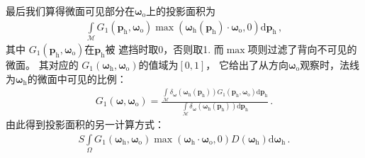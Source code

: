 最后我们算得微面可见部分在${\bm\omega}_{\mathrm{o}}$上的投影面积为
\begin{align}\label{eq:08ex01-AreaProjectionsMicrofacetVisible}
    \int\limits_{\mathcal{M}}G_1({\bm p}_{\mathrm{h}},{\bm\omega}_{\mathrm{o}})
    \max({\bm\omega}_{\mathrm{h}}({\bm p}_{\mathrm{h}})\cdot{\bm\omega}_{\mathrm{o}},0)
    \mathrm{d}{\bm p}_{\mathrm{h}}\, ,
\end{align}
其中
$G_1({\bm p}_{\mathrm{h}},{\bm\omega}_{\mathrm{o}})$在${\bm p}_{\mathrm{h}}$被
遮挡时取0，否则取1. 而$\max$项则过滤了背向不可见的微面。
其对应的
$G_1({\bm\omega}_{\mathrm{h}},{\bm\omega}_{\mathrm{o}})$的值域为$[0,1]$，
它给出了从方向${\bm\omega}_{\mathrm{o}}$观察时，法线为${\bm\omega}_{\mathrm{h}}$的微面中可见的比例：
\begin{align}\label{eq:08ex01-StaticMaskFunc}
    G_1({\bm\omega},{\bm\omega}_{\mathrm{o}})
    =\frac{\displaystyle\int\limits_{\mathcal{M}}
    \delta_{\bm\omega}({\bm\omega}_{\mathrm{h}}({\bm p}_{\mathrm{h}}))
    G_1({\bm p}_{\mathrm{h}},{\bm\omega}_{\mathrm{o}})\mathrm{d}{\bm p}_{\mathrm{h}}}
    {\displaystyle\int\limits_{\mathcal{M}}
    \delta_{\bm\omega}({\bm\omega}_{\mathrm{h}}({\bm p}_{\mathrm{h}}))
    \mathrm{d}{\bm p}_{\mathrm{h}}}\, .
\end{align}
由此得到投影面积的另一计算方式：
\begin{align}
    \label{eq:08ex01-AreaMicrosurface}
    S\int\limits_{\varOmega}G_1({\bm\omega}_{\mathrm{h}},{\bm\omega}_{\mathrm{o}})
    \max({\bm\omega}_{\mathrm{h}}\cdot{\bm\omega}_{\mathrm{o}},0)
    D({\bm\omega}_{\mathrm{h}})\mathrm{d}{\bm\omega}_{\mathrm{h}}\, .
\end{align}

